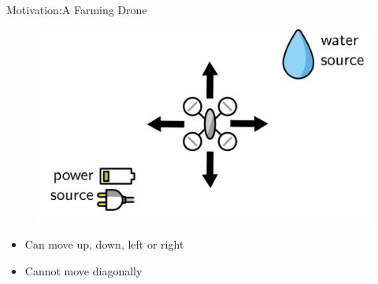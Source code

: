 \documentclass[usenames,dvipsnames]{beamer}
\begin{document}
\begin{frame}{Motivation:A Farming Drone}
    \begin{figure}
        \centering
        \includegraphics[scale=0.15]{images/drone-move.jpg}
    \end{figure}
    \begin{itemize}
        \item Can move up, down, left or right
        \item Cannot move diagonally
    \end{itemize}
\end{frame}


\end{document}
